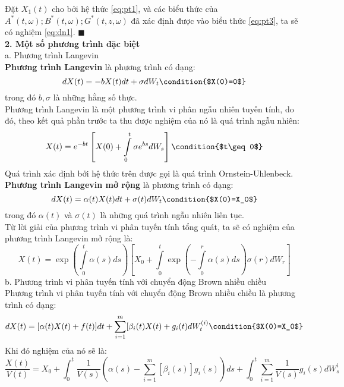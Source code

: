 \documentclass[14pt,a4paper]{article}
\numberwithin{equation}{section}
\begin{document}
Đặt $X_1(t)$ cho bởi hệ thức \eqref{eq:pt1}, và các biểu thức của $A^*(t,\omega);B^*(t,\omega);G^*(t,z,\omega)$ đã xác định được vào biểu thức \eqref{eq:pt3}, ta sẽ có nghiệm \eqref{eq:dn1}. $\blacksquare$\\
\textbf{2. Một số phương trình đặc biệt}\\
a. Phương trình Langevin\\
\textbf{Phương trình Langevin} là phương trình có dạng:
\begin{equation*}
	dX(t)=-bX(t)dt+\sigma dW_t \condition{$X(0)=0$}
\end{equation*}
trong đó $b, \sigma$ là những hằng số thực.\\
Phương trình Langevin là một phương trình vi phân ngẫu nhiên tuyến tính, do đó, theo kết quả phần trước ta thu được nghiệm của nó là quá trình ngẫu nhiên:
\begin{equation*}
	X(t)=e^{-bt}\left[X(0)+\int\limits_{0}^{t}\sigma e^{bs}dW_s \right] \condition{$t\geq 0$}
\end{equation*}
Quá trình xác định bởi hệ thức trên được gọi là quá trình Ornstein-Uhlenbeck.\\
\textbf{Phương trình Langevin mở rộng} là phương trình có dạng:
\begin{equation*}
	dX(t)=\alpha(t)X(t)dt+\sigma (t)dW_t \condition{$X(0)=X_0$}
\end{equation*}
trong đó $\alpha(t)$ và $\sigma(t)$ là những quá trình ngẫu nhiên liên tục.\\
Từ lời giải của phương trình vi phân tuyến tính tổng quát, ta sẽ có nghiệm của phương trình Langevin mở rộng là:
\begin{equation*}
	X(t)=\exp\left(\int\limits_{0}^{t}\alpha(s)ds \right)\left[X_0+\int\limits_{0}^{t}\exp\left(-\int\limits_{0}^{r}\alpha(s)ds \right)\sigma(r)dW_r \right]
\end{equation*}
b. Phương trình vi phân tuyến tính với chuyển động Brown nhiều chiều\\
Phương trình vi phân tuyến tính với chuyển động Brown nhiều chiều là phương trình có dạng:
\begin{equation*}
	dX(t)=[\alpha(t)X(t)+f(t)]dt+\sum_{i=1}^{m}[\beta_i(t)X(t)+g_i(t)dW_t^{(i)} \condition{$X(0)=X_0$}
\end{equation*}
Khi đó nghiệm của nó sẽ là:
\begin{equation*}
	\dfrac{X(t)}{V(t)}=X_0+\int_{0}^{t}\dfrac{1}{V(s)}\left(\alpha(s)-\sum_{i=1}^{m}[\beta_i(s)]g_i(s) \right)ds+\int_{0}^{t}\sum_{i=1}^{m}\dfrac{1}{V(s)}g_i(s)dW_{s}^{i}
\end{equation*}
\end{document}

